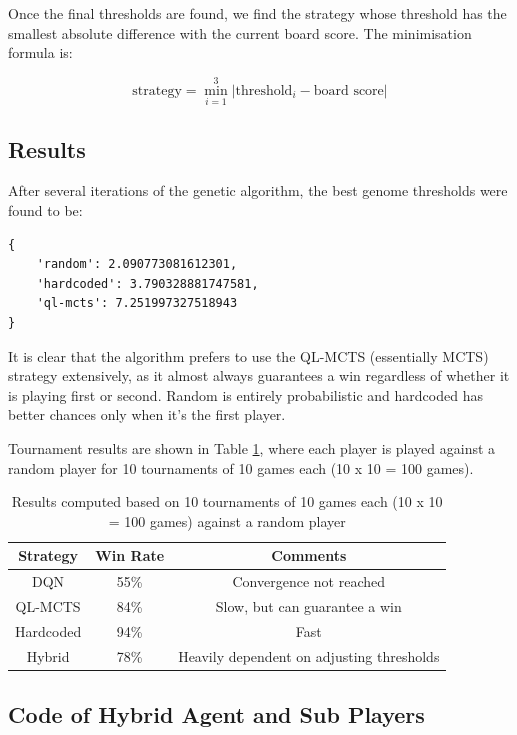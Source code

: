Once the final thresholds are found, we find the strategy whose threshold has the smallest absolute difference with the current board score. The minimisation formula is:

\begin{equation*}
    \text{strategy} = \min_{i=1}^{3} \left| \text{threshold}_i - \text{board score} \right|
\end{equation*}

\subsection{Results}

After several iterations of the genetic algorithm, the best genome thresholds were found to be:

\begin{verbatim}
{
    'random': 2.090773081612301,
    'hardcoded': 3.790328881747581,
    'ql-mcts': 7.251997327518943
}
\end{verbatim}

It is clear that the algorithm prefers to use the QL-MCTS (essentially MCTS) strategy extensively, as it almost always guarantees a win regardless of whether it is playing first or second. Random is entirely probabilistic and hardcoded has better chances only when it's the first player.

Tournament results are shown in Table \ref{results}, where each player is played against a random player for 10 tournaments of 10 games each (10 x 10 = 100 games).

\begin{table}[h]
    \centering
    \begin{tabular}{|c|c|c|}
        \hline
        \textbf{Strategy} & \textbf{Win Rate} & \textbf{Comments} \\ \hline
        DQN & 55\% & Convergence not reached \\ \hline
        QL-MCTS & 84\% & Slow, but can guarantee a win \\ \hline
        Hardcoded & 94\% & Fast \\ \hline
        Hybrid & 78\% & Heavily dependent on adjusting thresholds \\ \hline
    \end{tabular}
    \caption{Results computed based on 10 tournaments of 10 games each (10 x 10 = 100 games) against a random player}
    \label{results}
\end{table}

\subsection{Code of Hybrid Agent and Sub Players}

